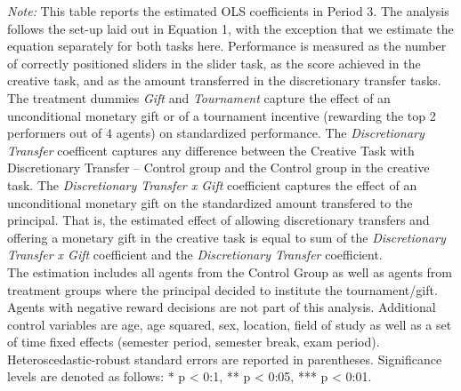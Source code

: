 \begin{table}[h]
\begin{center}
{\begin{tabular}{lcccc}
\end{tabular}
\begin{minipage}{\textwidth}
\footnotesize {\it Note:} This table reports the estimated OLS coefficients in Period 3. 
The analysis follows the set-up laid out in Equation 1, with the exception that we estimate the equation separately for both tasks here. 
Performance is measured as the number of correctly positioned sliders in the slider task, as the score achieved in the  creative task, and as the amount transferred in the discretionary transfer tasks. 
The treatment dummies \textit{Gift} and \textit{Tournament} capture the effect of an unconditional monetary gift or of a tournament incentive (rewarding the top 2 performers out of 4 agents) on standardized performance. 
The \textit{Discretionary Transfer} coefficent captures any difference between the Creative Task with Discretionary Transfer -- Control group and the Control group in the creative task. 
The \textit{Discretionary Transfer x Gift} coefficient captures the effect of an unconditional monetary gift on the standardized amount transfered to the principal. 
That is, the estimated effect of allowing discretionary transfers and offering a monetary gift in the creative task is equal to sum of the \textit{Discretionary Transfer x Gift} coefficient and the \textit{Discretionary Transfer} coefficient. \\
The estimation includes all agents from the Control Group as well as agents from treatment groups where the principal decided to institute the tournament/gift. Agents with negative reward decisions are not part of this analysis. 
Additional control variables are age, age squared, sex, location, field of study as well as a set of time fixed effects (semester period, semester break, exam period). 
Heteroscedastic-robust standard errors are reported in parentheses. Significance levels are denoted as follows: * p < 0:1, ** p < 0:05, *** p < 0:01. 
\end{minipage}}
\end{center}
\label{tab:Period3}
\end{table}
